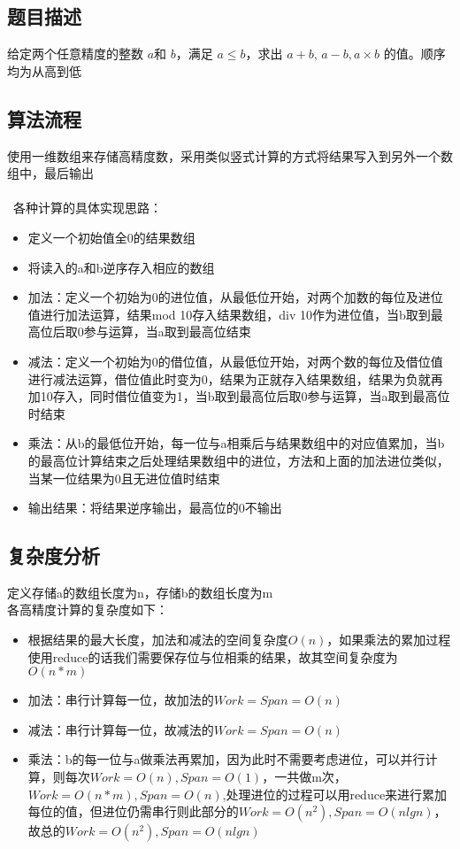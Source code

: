 \documentclass[UTF8,a4paperdui, %
]{ctexart}
\begin{document}
\subsection{题目描述}
给定两个任意精度的整数 $a $和 $b$，满足 $a \leq b$，求出 $a+b$, $a−b, a×b$ 的值。顺序均为从高到低
\subsection{算法流程}
使用一维数组来存储高精度数，采用类似竖式计算的方式将结果写入到另外一个数组中，最后输出\\
\\\
各种计算的具体实现思路：
\begin{itemize}
    \item 定义一个初始值全0的结果数组
    \item 将读入的a和b逆序存入相应的数组
    \item 加法：定义一个初始为0的进位值，从最低位开始，对两个加数的每位及进位值进行加法运算，结果mod 10存入结果数组，div 10作为进位值，当b取到最高位后取0参与运算，当a取到最高位结束
    \item 减法：定义一个初始为0的借位值，从最低位开始，对两个数的每位及借位值进行减法运算，借位值此时变为0，结果为正就存入结果数组，结果为负就再加10存入，同时借位值变为1，当b取到最高位后取0参与运算，当a取到最高位时结束
    \item 乘法：从b的最低位开始，每一位与a相乘后与结果数组中的对应值累加，当b的最高位计算结束之后处理结果数组中的进位，方法和上面的加法进位类似，当某一位结果为0且无进位值时结束
    \item 输出结果：将结果逆序输出，最高位的0不输出
\end{itemize}
\subsection{复杂度分析}
定义存储a的数组长度为n，存储b的数组长度为m\\
各高精度计算的复杂度如下：
\begin{itemize}
    \item 根据结果的最大长度，加法和减法的空间复杂度$O(n)$，如果乘法的累加过程使用reduce的话我们需要保存位与位相乘的结果，故其空间复杂度为$O(n*m)$
    \item 加法：串行计算每一位，故加法的$Work=Span=O(n)$
    \item 减法：串行计算每一位，故减法的$Work=Span=O(n)$
    \item 乘法：b的每一位与a做乘法再累加，因为此时不需要考虑进位，可以并行计算，则每次$Work=O(n),Span=O(1)$，一共做m次，$Work=O(n*m),Span=O(n)$,处理进位的过程可以用reduce来进行累加每位的值，但进位仍需串行则此部分的$Work=O(n^2),Span=O(nlgn)$，故总的$Work=O(n^2),Span=O(nlgn)$
\end{itemize}
\end{document}
